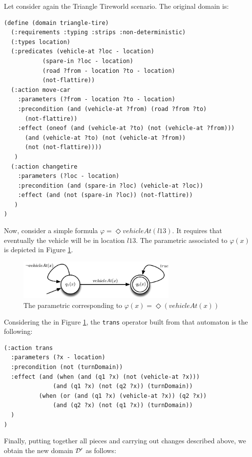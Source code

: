 \begin{example}\label{ex:new-dom}
Let consider again the Triangle Tireworld scenario. The original \PDDL domain is:
\begin{lstlisting}[language=PDDL, escapechar=£]
(define (domain triangle-tire)
  (:requirements :typing :strips :non-deterministic)
  (:types location)
  (:predicates (vehicle-at ?loc - location)
	       (spare-in ?loc - location)
	       (road ?from - location ?to - location)
	       (not-flattire))
  (:action move-car
    :parameters (?from - location ?to - location)
    :precondition (and (vehicle-at ?from) (road ?from ?to) 
      (not-flattire))
    :effect (oneof (and (vehicle-at ?to) (not (vehicle-at ?from)))
	  (and (vehicle-at ?to) (not (vehicle-at ?from)) 
	  (not (not-flattire))))
   )
  (:action changetire
    :parameters (?loc - location)
    :precondition (and (spare-in ?loc) (vehicle-at ?loc))
    :effect (and (not (spare-in ?loc)) (not-flattire))
   )
)
\end{lstlisting}
Now, consider a simple \LTLf formula $\varphi = \Diamond vehicleAt(l13)$. It requires that eventually the vehicle will be in location $l13$. The parametric \DFA associated to $\varphi(x)$ is depicted in Figure \ref{fig:dfa-parametric2}.
\begin{figure}[h]
\centering
\includegraphics[width=0.7\textwidth]{images/automa-param2}
\caption{The parametric \DFA corresponding to $\varphi(x) = \Diamond(vehicleAt(x))$} 
\label{fig:dfa-parametric2}
\end{figure}

Considering the \DFA in Figure \ref{fig:dfa-parametric2}, the \texttt{trans} operator built from that automaton is the following:
\begin{lstlisting}[language=PDDL, escapechar=£]
(:action trans
  :parameters (?x - location)
  :precondition (not (turnDomain))
  :effect (and (when (and (q1 ?x) (not (vehicle-at ?x)))
              (and (q1 ?x) (not (q2 ?x)) (turnDomain))
          (when (or (and (q1 ?x) (vehicle-at ?x)) (q2 ?x))
              (and (q2 ?x) (not (q1 ?x)) (turnDomain))
  )
)
\end{lstlisting}

Finally, putting together all pieces and carrying out changes described above, we obtain the new domain $\mathcal{D}'$ as follows:


\end{example}
